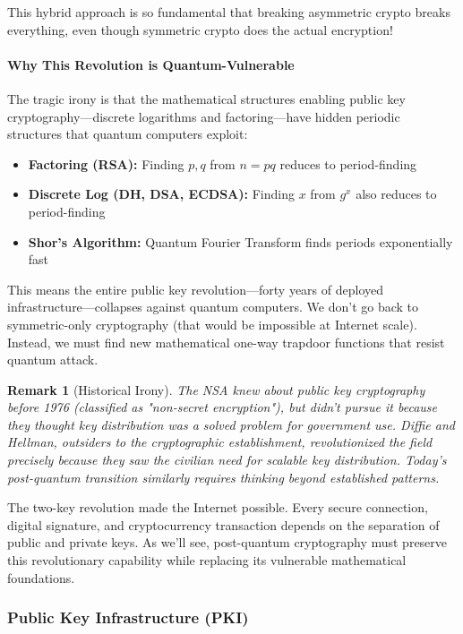 \documentclass[11pt,a4paper]{article}
\newtheorem{remark}{Remark}
\begin{document}
This hybrid approach is so fundamental that breaking asymmetric crypto breaks everything, even though symmetric crypto does the actual encryption!

\paragraph{Why This Revolution is Quantum-Vulnerable}

The tragic irony is that the mathematical structures enabling public key cryptography---discrete logarithms and factoring---have hidden periodic structures that quantum computers exploit:

\begin{itemize}
    \item \textbf{Factoring (RSA):} Finding $p,q$ from $n=pq$ reduces to period-finding
    \item \textbf{Discrete Log (DH, DSA, ECDSA):} Finding $x$ from $g^x$ also reduces to period-finding
    \item \textbf{Shor's Algorithm:} Quantum Fourier Transform finds periods exponentially fast
\end{itemize}

This means the entire public key revolution---forty years of deployed infrastructure---collapses against quantum computers. We don't go back to symmetric-only cryptography (that would be impossible at Internet scale). Instead, we must find new mathematical one-way trapdoor functions that resist quantum attack.

\begin{remark}[Historical Irony]
The NSA knew about public key cryptography before 1976 (classified as "non-secret encryption"), but didn't pursue it because they thought key distribution was a solved problem for government use. Diffie and Hellman, outsiders to the cryptographic establishment, revolutionized the field precisely because they saw the civilian need for scalable key distribution. Today's post-quantum transition similarly requires thinking beyond established patterns.
\end{remark}

The two-key revolution made the Internet possible. Every secure connection, digital signature, and cryptocurrency transaction depends on the separation of public and private keys. As we'll see, post-quantum cryptography must preserve this revolutionary capability while replacing its vulnerable mathematical foundations.

\subsubsection{Public Key Infrastructure (PKI)}
\end{document}
